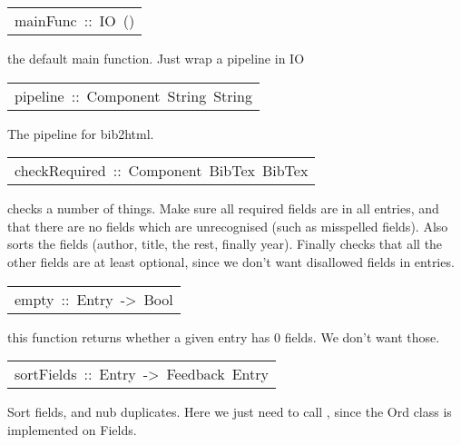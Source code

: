 \begin{haddockdesc}
\item[\begin{tabular}{@{}l}
mainFunc\ ::\ IO\ ()
\end{tabular}]\haddockbegindoc
the default main function. Just wrap a pipeline in IO
\par

\end{haddockdesc}
\begin{haddockdesc}
\item[\begin{tabular}{@{}l}
pipeline\ ::\ Component\ String\ String
\end{tabular}]\haddockbegindoc
The pipeline for bib2html. 
\par

\end{haddockdesc}
\begin{haddockdesc}
\item[\begin{tabular}{@{}l}
checkRequired\ ::\ Component\ BibTex\ BibTex
\end{tabular}]\haddockbegindoc
checks a number of things. Make sure all required fields are in all entries, and that there are no fields 
 which are unrecognised (such as misspelled fields). Also sorts the fields (author, title, the rest, finally year). Finally
 checks that all the other fields are at least optional, since we don't want disallowed fields in entries. 
\par

\end{haddockdesc}
\begin{haddockdesc}
\item[\begin{tabular}{@{}l}
empty\ ::\ Entry\ ->\ Bool
\end{tabular}]\haddockbegindoc
this function returns whether a given entry has 0 fields. We don't want those. 
\par

\end{haddockdesc}
\begin{haddockdesc}
\item[\begin{tabular}{@{}l}
sortFields\ ::\ Entry\ ->\ Feedback\ Entry
\end{tabular}]\haddockbegindoc
Sort fields, and nub duplicates. Here we just need to call , since
 the Ord class is implemented on Fields.
\par

\end{haddockdesc}
